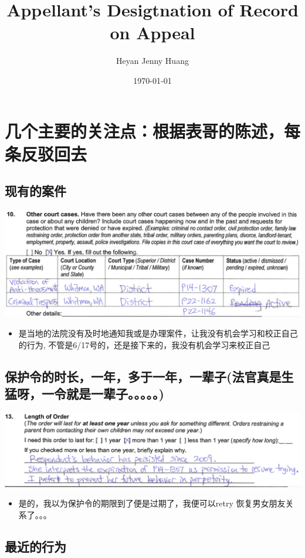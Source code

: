 \documentclass[9pt, b5paaper]{book}
\author{Heyan Jenny Huang}
\date{\today}
\title{Appellant's Desigtnation of Record on Appeal}
\begin{document}
\maketitle
\tableofcontents


\chapter{几个主要的关注点：根据表哥的陈述，每条反驳回去}
\label{sec-1}
\section{现有的案件}
\label{sec-1-1}

\includegraphics[width=.9\linewidth]{./pic/dearCousin_20220919_153339.png}
\begin{itemize}
\item 是当地的法院没有及时地通知我或是办理案件，让我没有机会学习和校正自己的行为, 不管是6/17号的，还是接下来的，我没有机会学习来校正自己
\end{itemize}
\section{保护令的时长，一年，多于一年，一辈子(法官真是生猛呀，一令就是一辈子。。。。。)}
\label{sec-1-2}

\includegraphics[width=.9\linewidth]{./pic/dearCousin_20220919_153711.png}
\begin{itemize}
\item 是的，我以为保护令的期限到了便是过期了，我便可以retry 恢复男女朋友关系了。。。
\end{itemize}
\section{最近的行为}
\label{sec-1-3}
\end{document}
